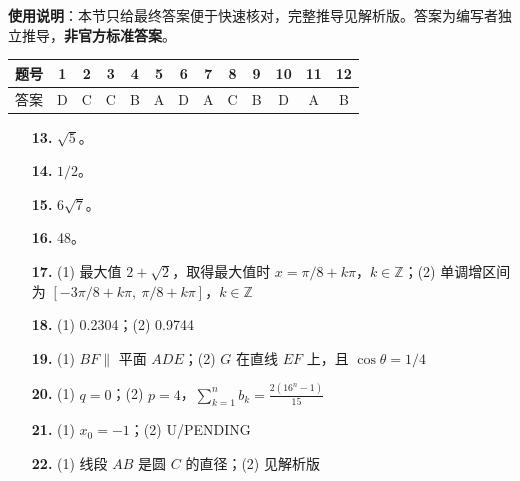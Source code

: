 
\begin{gknotice}
\textbf{使用说明}：本节只给最终答案便于快速核对，完整推导见解析版。答案为编写者独立推导，\textbf{非官方标准答案}。
\end{gknotice}

\begin{center}\begin{tabular}{ccccccccccccc}
\toprule
题号 & 1 & 2 & 3 & 4 & 5 & 6 & 7 & 8 & 9 & 10 & 11 & 12 \\
\midrule
答案 & D & C & C & B & A & D & A & C & B & D & A & B \\
\bottomrule
\end{tabular}\end{center}

\begin{itemize}[leftmargin=2.6em]
  \item[\textbf{13.}] $\sqrt5$。
  \item[\textbf{14.}] $1/2$。
  \item[\textbf{15.}] $6\sqrt7$。
  \item[\textbf{16.}] 48。
\end{itemize}

\begin{itemize}[leftmargin=2.6em]
  \item[\textbf{17.}] (1) 最大值 $2+\sqrt2$，取得最大值时 $x=\pi/8+k\pi$，$k\in\mathbb Z$；(2) 单调增区间为 $[-3\pi/8+k\pi,\ \pi/8+k\pi]$，$k\in\mathbb Z$
  \item[\textbf{18.}] (1) 0.2304；(2) 0.9744
  \item[\textbf{19.}] (1) $BF\parallel$ 平面 $ADE$；(2) $G$ 在直线 $EF$ 上，且 $\cos\theta=1/4$
  \item[\textbf{20.}] (1) $q=0$；(2) $p=4$，$\displaystyle \sum_{k=1}^{n}b_k=\frac{2(16^n-1)}{15}$
  \item[\textbf{21.}] (1) $x_0=-1$；(2) U/PENDING
  \item[\textbf{22.}] (1) 线段 $AB$ 是圆 $C$ 的直径；(2) 见解析版
\end{itemize}
